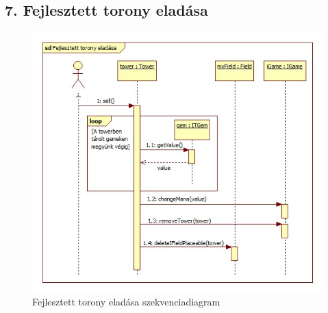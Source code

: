 \subsection{7. Fejlesztett torony eladása}
\begin{figure}[H]
\begin{center}
\includegraphics[width=17cm]{chapters/chapter05/images/sd_Fejlesztett_torony_eladasa.jpg}
\caption{Fejlesztett torony eladása szekvenciadiagram}
\label{fig:sd_Fejlesztett_torony_eladasa}
\end{center}
\end{figure}

